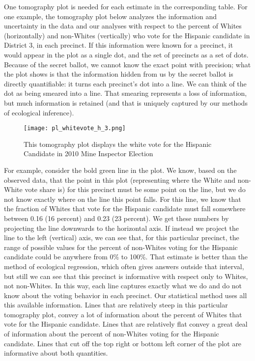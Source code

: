\documentclass[12pt]{scrartcl}
\begin{document}
One tomography plot is needed for each estimate in the corresponding
table. For one example, the tomography plot below analyzes the
information and uncertainty in the data and our analyses with respect
to the percent of Whites (horizontally) and non-Whites (vertically)
who vote for the Hispanic candidate in District 3, in each precinct.
If this information were known for a precinct, it would appear in the
plot as a single dot, and the set of precincts as a set of dots.
Because of the secret ballot, we cannot know the exact point with
precision; what the plot shows is that the information hidden from us
by the secret ballot is directly quantifiable: it turns each
precinct's dot into a line.  We can think of the dot as being smeared
into a line. That smearing represents a loss of information, but much
information is retained (and that is uniquely captured by our methods
of ecological inference).

\begin{figure}[htb]
\begin{centering}
\texttt{[image: pl\_whitevote\_h\_3.png]}
\caption{This tomography plot displays the white vote for the Hispanic Candidate in 2010 Mine Inspector Election}
\end{centering}
\label{tomog}
\end{figure}

For example, consider the bold green line in the plot. We know, based
on the observed data, that the point in this plot (representing where
the White and non-White vote share is) for this precinct must be some
point on the line, but we do not know exactly where on the line this
point falls. For this line, we know that the fraction of Whites that
vote for the Hispanic candidate must fall somewhere between 0.16 (16
percent) and 0.23 (23 percent). We get these numbers by projecting the
line downwards to the horizontal axis. If instead we project the line
to the left (vertical) axis, we can see that, for this particular
precinct, the range of possible values for the percent of non-Whites
voting for the Hispanic candidate could be anywhere from 0\% to 100\%.
That estimate is better than the method of ecological regression,
which often gives answers outside that interval, but still we can see
that this precinct is informative with respect only to Whites, not
non-Whites. In this way, each line captures exactly what we do and do
not know about the voting behavior in each precinct. Our statistical
method uses all this available information. Lines that are relatively
steep in this particular tomography plot, convey a lot of information
about the percent of Whites that vote for the Hispanic candidate.
Lines that are relatively flat convey a great deal of information
about the percent of non-Whites voting for the Hispanic candidate.
Lines that cut off the top right or bottom left corner of the plot are
informative about both quantities.
\end{document}
